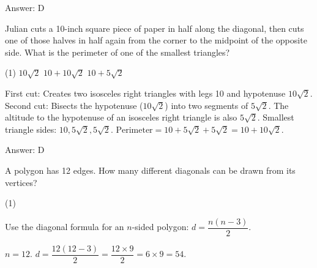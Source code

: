 \documentclass[11pt,paper=a4,answers]{exam}
\begin{document}
\begin{questions}
\begin{solution}
Answer: \colorbox{yellow!100}{D}
\end{solution}

\vspace{1cm}

\question
Julian cuts a 10-inch square piece of paper in half along the diagonal, then cuts one of those halves in half again from the corner to the midpoint of the opposite side. What is the perimeter of one of the smallest triangles?

\begin{tasks}(1)
 \task[B)] $10\sqrt{2}$  \task[D)] $10 + 10\sqrt{2}$ \task[E)] $10 + 5\sqrt{2}$
\end{tasks}

\begin{solution}

\begin{center}
First cut: Creates two isosceles right triangles with legs 10 and hypotenuse $10\sqrt{2}$.
\vspace{5pt}
Second cut: Bisects the hypotenuse ($10\sqrt{2}$) into two segments of $5\sqrt{2}$.
\vspace{5pt}
The altitude to the hypotenuse of an isosceles right triangle is also $5\sqrt{2}$.
\vspace{5pt}
Smallest triangle sides: $10, 5\sqrt{2}, 5\sqrt{2}$.
\vspace{5pt}
$\text{Perimeter} = 10 + 5\sqrt{2} + 5\sqrt{2} = 10 + 10\sqrt{2}$.
\end{center}

Answer: \colorbox{yellow!100}{D}
\end{solution}

\vspace{1cm}

\question
A polygon has 12 edges. How many different diagonals can be drawn from its vertices?

\begin{tasks}(1)
    
\end{tasks}

\begin{solution}
Use the diagonal formula for an $n$-sided polygon: $d = \dfrac{n(n - 3)}{2}$.
\vspace{5pt}
\begin{center}
$n = 12$.
\vspace{5pt}
$d = \dfrac{12(12 - 3)}{2} = \dfrac{12 \times 9}{2} = 6 \times 9 = 54$.
\end{center}


\end{solution}
\end{questions}
\end{document}
